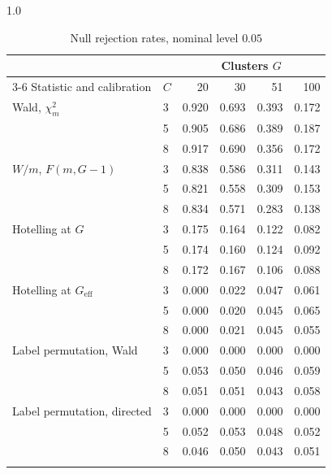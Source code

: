 \documentclass[12pt]{article}
\theoremstyle{definition}
\numberwithin{equation}{section}
\begin{document}
\begin{table}[!tbp]
\centering
\small
\begin{spacing}{1.0}
\caption{Null rejection rates, nominal level $0.05$}
\label{tab:size}
\begin{tabular}{llrrrr}
\toprule
 & & \multicolumn{4}{c}{Clusters $G$} \\
\cmidrule(lr){3-6}
Statistic and calibration & $C$ & 20 & 30 & 51 & 100 \\
\midrule
Wald, $\chi^2_m$                  & 3 & 0.920 & 0.693 & 0.393 & 0.172 \\
                                  & 5 & 0.905 & 0.686 & 0.389 & 0.187 \\
                                  & 8 & 0.917 & 0.690 & 0.356 & 0.172 \\
\addlinespace
$W/m$, $F(m,G-1)$                 & 3 & 0.838 & 0.586 & 0.311 & 0.143 \\
                                  & 5 & 0.821 & 0.558 & 0.309 & 0.153 \\
                                  & 8 & 0.834 & 0.571 & 0.283 & 0.138 \\
\addlinespace
Hotelling at $G$                  & 3 & 0.175 & 0.164 & 0.122 & 0.082 \\
                                  & 5 & 0.174 & 0.160 & 0.124 & 0.092 \\
                                  & 8 & 0.172 & 0.167 & 0.106 & 0.088 \\
\addlinespace
Hotelling at $G_{\mathrm{eff}}$   & 3 & 0.000 & 0.022 & 0.047 & 0.061 \\
                                  & 5 & 0.000 & 0.020 & 0.045 & 0.065 \\
                                  & 8 & 0.000 & 0.021 & 0.045 & 0.055 \\
\addlinespace
Label permutation, Wald           & 3 & 0.000 & 0.000 & 0.000 & 0.000 \\
                                  & 5 & 0.053 & 0.050 & 0.046 & 0.059 \\
                                  & 8 & 0.051 & 0.051 & 0.043 & 0.058 \\
\addlinespace
Label permutation, directed       & 3 & 0.000 & 0.000 & 0.000 & 0.000 \\
                                  & 5 & 0.052 & 0.053 & 0.048 & 0.052 \\
                                  & 8 & 0.046 & 0.050 & 0.043 & 0.051 \\
\addlinespace

\end{tabular}
\end{spacing}
\end{table}
\end{document}
